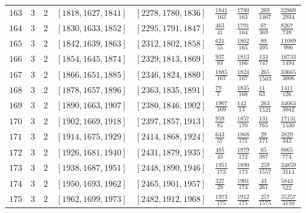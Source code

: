 \documentclass[12pt]{extarticle}
\begin{document}
\begin{longtable}{lllllllll}
$163$ & $3$ & $2$ & $\left[1818, 1627, 1841\right]$ & $\left[2278, 1780, 1836\right]$ & $\frac{1841}{163}$ & $\frac{1780}{163}$ & $\frac{269}{1467}$ & $\frac{32869}{2934}$ \\
$164$ & $3$ & $2$ & $\left[1830, 1633, 1852\right]$ & $\left[2295, 1791, 1847\right]$ & $\frac{463}{41}$ & $\frac{1791}{164}$ & $\frac{67}{369}$ & $\frac{8267}{738}$ \\
$165$ & $3$ & $2$ & $\left[1842, 1639, 1863\right]$ & $\left[2312, 1802, 1858\right]$ & $\frac{621}{55}$ & $\frac{1802}{165}$ & $\frac{89}{495}$ & $\frac{11089}{990}$ \\
$166$ & $3$ & $2$ & $\left[1854, 1645, 1874\right]$ & $\left[2329, 1813, 1869\right]$ & $\frac{937}{83}$ & $\frac{1813}{166}$ & $\frac{133}{747}$ & $\frac{16733}{1494}$ \\
$167$ & $3$ & $2$ & $\left[1866, 1651, 1885\right]$ & $\left[2346, 1824, 1880\right]$ & $\frac{1885}{167}$ & $\frac{1824}{167}$ & $\frac{265}{1503}$ & $\frac{33665}{3006}$ \\
$168$ & $3$ & $2$ & $\left[1878, 1657, 1896\right]$ & $\left[2363, 1835, 1891\right]$ & $\frac{79}{7}$ & $\frac{1835}{168}$ & $\frac{11}{63}$ & $\frac{1411}{126}$ \\
$169$ & $3$ & $2$ & $\left[1890, 1663, 1907\right]$ & $\left[2380, 1846, 1902\right]$ & $\frac{1907}{169}$ & $\frac{142}{13}$ & $\frac{263}{1521}$ & $\frac{34063}{3042}$ \\
$170$ & $3$ & $2$ & $\left[1902, 1669, 1918\right]$ & $\left[2397, 1857, 1913\right]$ & $\frac{959}{85}$ & $\frac{1857}{170}$ & $\frac{131}{765}$ & $\frac{17131}{1530}$ \\
$171$ & $3$ & $2$ & $\left[1914, 1675, 1929\right]$ & $\left[2414, 1868, 1924\right]$ & $\frac{643}{57}$ & $\frac{1868}{171}$ & $\frac{29}{171}$ & $\frac{3829}{342}$ \\
$172$ & $3$ & $2$ & $\left[1926, 1681, 1940\right]$ & $\left[2431, 1879, 1935\right]$ & $\frac{485}{43}$ & $\frac{1879}{172}$ & $\frac{65}{387}$ & $\frac{8665}{774}$ \\
$173$ & $3$ & $2$ & $\left[1938, 1687, 1951\right]$ & $\left[2448, 1890, 1946\right]$ & $\frac{1951}{173}$ & $\frac{1890}{173}$ & $\frac{259}{1557}$ & $\frac{34859}{3114}$ \\
$174$ & $3$ & $2$ & $\left[1950, 1693, 1962\right]$ & $\left[2465, 1901, 1957\right]$ & $\frac{327}{29}$ & $\frac{1901}{174}$ & $\frac{43}{261}$ & $\frac{5843}{522}$ \\
$175$ & $3$ & $2$ & $\left[1962, 1699, 1973\right]$ & $\left[2482, 1912, 1968\right]$ & $\frac{1973}{175}$ & $\frac{1912}{175}$ & $\frac{257}{1575}$ & $\frac{35257}{3150}$ \\

\end{longtable}
\end{document}
